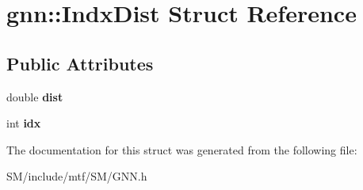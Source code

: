 \hypertarget{structgnn_1_1IndxDist}{\section{gnn\-:\-:Indx\-Dist Struct Reference}
\label{structgnn_1_1IndxDist}
}
\subsection*{Public Attributes}
\begin{DoxyCompactItemize}
\item 
\hypertarget{structgnn_1_1IndxDist_a0aeaf1be2302feafacfb3edee6c748bb}{double {\bfseries dist}}\label{structgnn_1_1IndxDist_a0aeaf1be2302feafacfb3edee6c748bb}

\item 
\hypertarget{structgnn_1_1IndxDist_a301ec58399bc72b31e0882d6881f8abb}{int {\bfseries idx}}\label{structgnn_1_1IndxDist_a301ec58399bc72b31e0882d6881f8abb}

\end{DoxyCompactItemize}


The documentation for this struct was generated from the following file\-:\begin{DoxyCompactItemize}
\item 
S\-M/include/mtf/\-S\-M/G\-N\-N.\-h\end{DoxyCompactItemize}
